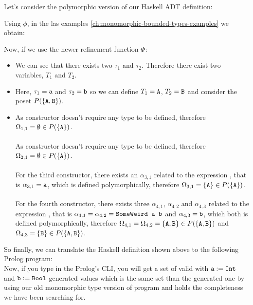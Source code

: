 	\begin{example}[SomeWeird]
		Let's consider the polymorphic version of our  Haskell ADT definition:
		
		Using $\phi$, in the las examples \ref{ch:monomorphic-bounded-types-examples} we obtain:
		
		Now, if we use the newer refinement function $\Phi$:
		\begin{itemize}
			\item We can see that there exists two $\tau_1$ and $\tau_2$. Therefore there exist two variables, $T_1$ and $T_2$.
			\item Here, $\tau_1 = \texttt{a}$ and $\tau_2 = \texttt{b}$ so we can define $T_1 = \texttt{A}$, $T_2 = \texttt{B}$ and consider the poset $P(\{\texttt{A}, \texttt{B}\})$.
			\item As  constructor doesn't require any type to be defined, therefore $\Omega_{1,1} = \emptyset \in P(\{ \texttt{A} \})$. \\\\
			      As  constructor doesn't require any type to be defined, therefore $\Omega_{2,1} = \emptyset \in P(\{ \texttt{A} \})$. \\\\
			      For the third constructor, there exists an $\alpha_{3,1}$ related to the expression , that is $\alpha_{3,1} = \texttt{a}$, which is defined polymorphically, therefore $\Omega_{3,1} = \{\texttt{A}\} \in P(\{ \texttt{A} \})$. \\\\
			      For the fourth constructor, there exists three $\alpha_{4,1}$, $\alpha_{4,2}$ and $\alpha_{4,3}$ related to the expression , that is $\alpha_{4,1} = \alpha_{4,2} = \texttt{SomeWeird a b}$ and $\alpha_{4,3} = \texttt{b}$, which both is defined polymorphically, therefore $\Omega_{4,1} = \Omega_{4,2} = \{\texttt{A}, \texttt{B}\} \in P(\{ \texttt{A} , \texttt{B} \})$ and $\Omega_{4,3} = \{\texttt{B}\} \in P(\{ \texttt{A} , \texttt{B} \})$.
		\end{itemize}
		So finally, we can translate the Haskell definition shown above to the following Prolog program:\\
		
		Now, if you type  in the Prolog's CLI, you will get a set of valid  with $\texttt{a} := \texttt{Int}$ and $\texttt{b} := \texttt{Bool}$ generated values which is the same set than the generated one by using our old monomorphic type version of  program and holds the completeness we have been searching for.\\
	\end{example}
